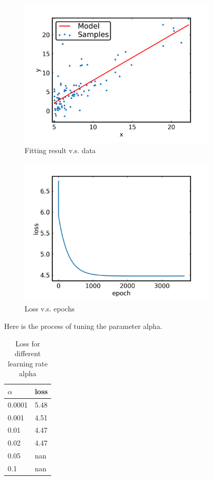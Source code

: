 \begin{figure}[H]
\centering
  \includegraphics[width=0.85\textwidth]{fig/prob1/fit.png}
\centering 
\caption{Fitting result v.s. data}
\label{fig:fit}
\end{figure}

\begin{figure}[H]
\centering
  \includegraphics[width=0.85\textwidth]{fig/prob1/loss.png}
\centering 
\caption{Loss v.s. epochs}
\label{fig:loss}
\end{figure}

Here is the process of tuning the parameter alpha. 

\begin{table}[htb]
\centering
\caption{Loss for different learning rate alpha}
\begin{tabular}{|l|l|}
\hline
$\alpha$ & loss \\ \hline
0.0001 & 5.48 \\ \hline
0.001 & 4.51 \\ \hline
0.01 & 4.47 \\ \hline
0.02 & 4.47 \\ \hline
0.05 & nan \\ \hline
0.1 & nan \\ \hline
\hline
\end{tabular}
\label{tab:alpha}
\end{table}

